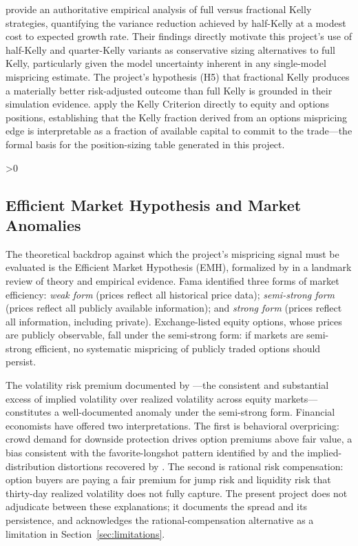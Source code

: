 \documentclass[12pt, letterpaper]{article}
\let\oldsubsection\subsection
\renewcommand{\subsection}{%
  \ifnum\value{subsection}>0 \clearpage\fi
  \oldsubsection
}
\begin{document}
\citet{MacLean2010} provide an authoritative empirical analysis of
full versus fractional Kelly strategies, quantifying the variance
reduction achieved by half-Kelly at a modest cost to expected growth
rate. Their findings directly motivate this project's use of half-Kelly
and quarter-Kelly variants as conservative sizing alternatives to full
Kelly, particularly given the model uncertainty inherent in any
single-model mispricing estimate. The project's hypothesis (H5) that
fractional Kelly produces a materially better risk-adjusted outcome
than full Kelly is grounded in their simulation evidence.
\citet{Rotando1992} apply the Kelly Criterion directly to equity and
options positions, establishing that the Kelly fraction derived from an
options mispricing edge is interpretable as a fraction of available
capital to commit to the trade---the formal basis for the
position-sizing table generated in this project.

\subsection{Efficient Market Hypothesis and Market Anomalies}

The theoretical backdrop against which the project's mispricing signal
must be evaluated is the Efficient Market Hypothesis (EMH), formalized
by \citet{Fama1970} in a landmark review of theory and empirical
evidence. Fama identified three forms of market efficiency:
\textit{weak form} (prices reflect all historical price data);
\textit{semi-strong form} (prices reflect all publicly available
information); and \textit{strong form} (prices reflect all
information, including private). Exchange-listed equity options, whose
prices are publicly observable, fall under the semi-strong form: if
markets are semi-strong efficient, no systematic mispricing of publicly
traded options should persist.

The volatility risk premium documented by \citet{Carr2009}---the
consistent and substantial excess of implied volatility over realized
volatility across equity markets---constitutes a well-documented
anomaly under the semi-strong form. Financial economists have offered
two interpretations. The first is behavioral overpricing: crowd demand
for downside protection drives option premiums above fair value, a bias
consistent with the favorite-longshot pattern identified by
\citet{Thaler1988} and the implied-distribution distortions recovered
by \citet{Jackwerth1996}. The second is rational risk compensation:
option buyers are paying a fair premium for jump risk and liquidity
risk that thirty-day realized volatility does not fully capture. The
present project does not adjudicate between these explanations; it
documents the spread and its persistence, and acknowledges the
rational-compensation alternative as a limitation in
Section~\ref{sec:limitations}.
\end{document}
